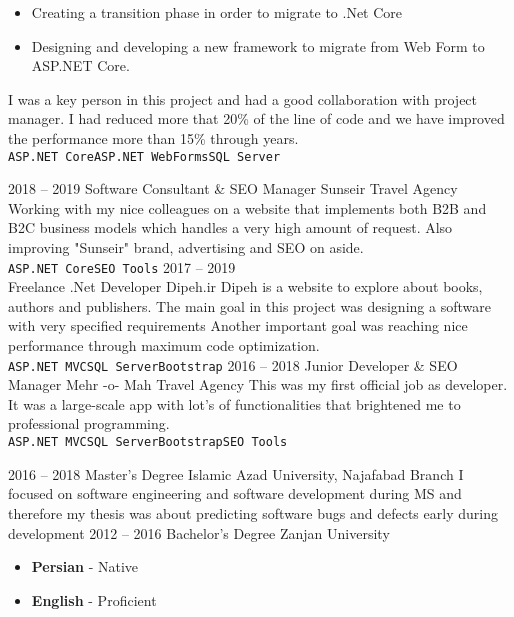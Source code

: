 \documentclass[a4paper]{developercv} %
\begin{document}
\begin{entrylist}
{\begin{itemize}[noitemsep]
		\item Creating a transition phase in order to migrate to .Net Core
		\item Designing and developing a new framework to migrate from Web Form to ASP.NET Core.
	\end{itemize}
	I was a key person in this project and had a good collaboration with project manager. I had reduced more that 20\% of the line of code and we have improved the performance more than 15\% through years.
		\\\texttt{ASP.NET Core}\slashsep\texttt{ASP.NET WebForms}\slashsep\texttt{SQL Server}}
	\entry
	{2018 -- 2019}
	{Software Consultant \& SEO Manager}
	{Sunseir Travel Agency}
	{Working with my nice colleagues on a website that implements both B2B and B2C business models which handles a very high amount of request. Also improving "Sunseir" brand, advertising and SEO on aside.
		\\\texttt{ASP.NET Core}\slashsep\texttt{SEO Tools}}
	\entry
	{2017 -- 2019\\\footnotesize{Freelance}}
	{.Net Developer}
	{Dipeh.ir}
	{Dipeh is a website to explore about books, authors and publishers. The main goal in this project was designing a software with very specified requirements Another important goal was reaching nice performance through maximum code optimization.
		\\\texttt{ASP.NET MVC}\slashsep\texttt{SQL Server}\slashsep\texttt{Bootstrap}}
	\entry
	{2016 -- 2018}
	{Junior Developer \& SEO Manager}
	{Mehr -o- Mah Travel Agency}
	{This was my first official job as developer. It was a large-scale app with lot's of functionalities that brightened me to professional programming.
		\\\texttt{ASP.NET MVC}\slashsep\texttt{SQL Server}\slashsep\texttt{Bootstrap}\slashsep\texttt{SEO Tools}}
\end{entrylist}


\begin{entrylist}
	\entry
	{2016 -- 2018}
	{Master's Degree}
	{Islamic Azad University, Najafabad Branch}
	{I focused on software engineering and software development during MS and therefore my thesis was about predicting software bugs and defects early during development}
	\entry
	{2012 -- 2016}
	{Bachelor's Degree}
	{Zanjan University}
	{}
\end{entrylist}


\begin{itemize}
	\setlength\itemsep{3px}
	\item \textbf{Persian} - Native
	\item \textbf{English} - Proficient
\end{itemize}
\end{document}

